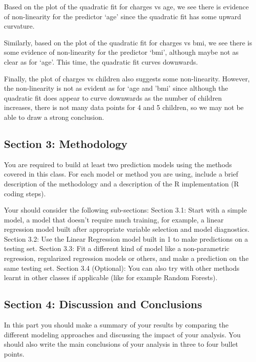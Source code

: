 \documentclass[
  12pt,
]{article}
\begin{document}
Based on the plot of the quadratic fit for charges vs age, we see there
is evidence of non-linearity for the predictor `age' since the quadratic
fit has some upward curvature.

Similarly, based on the plot of the quadratic fit for charges vs bmi, we
see there is some evidence of non-linearity for the predictor `bmi',
although maybe not as clear as for `age'. This time, the quadratic fit
curves downwards.

Finally, the plot of charges vs children also suggests some
non-linearity. However, the non-linearity is not as evident as for `age
and 'bmi' since although the quadratic fit does appear to curve
downwards as the number of children increases, there is not many data
points for 4 and 5 children, so we may not be able to draw a strong
conclusion.

\newpage

\subsection{Section 3: Methodology}\label{section-3-methodology}

You are required to build at least two prediction models using the
methods covered in this class. For each model or method you are using,
include a brief description of the methodology and a description of the
R implementation (R coding steps).

Your should consider the following sub-sections: Section 3.1: Start with
a simple model, a model that doesn't require much training, for example,
a linear regression model built after appropriate variable selection and
model diagnostics. Section 3.2: Use the Linear Regression model built in
1 to make predictions on a testing set. Section 3.3: Fit a different
kind of model like a non-parametric regression, regularized regression
models or others, and make a prediction on the same testing set. Section
3.4 (Optional): You can also try with other methods learnt in other
classes if applicable (like for example Random Forests).

\newpage

\subsection{Section 4: Discussion and
Conclusions}\label{section-4-discussion-and-conclusions}

In this part you should make a summary of your results by comparing the
different modeling approaches and discussing the impact of your
analysis. You should also write the main conclusions of your analysis in
three to four bullet points.
\end{document}
